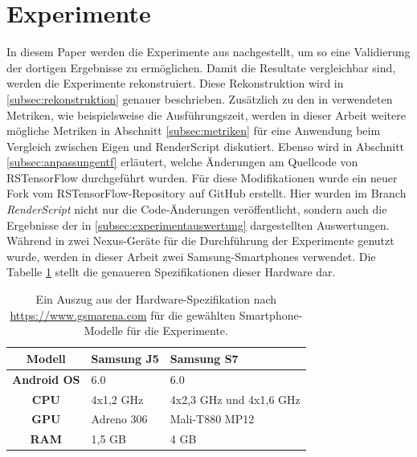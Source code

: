 \section{Experimente}
\label{sec:experimente}
In diesem Paper werden die Experimente aus \cite{rstensorflow2017} nachgestellt, um so eine Validierung der dortigen Ergebnisse zu ermöglichen. Damit die Resultate vergleichbar sind, werden die Experimente rekonstruiert. Diese Rekonstruktion wird in \ref{subsec:rekonstruktion} genauer beschrieben. Zusätzlich zu den in \cite{rstensorflow2017} verwendeten Metriken, wie beispielsweise die Ausführungszeit, werden in dieser Arbeit weitere mögliche Metriken in Abschnitt \ref{subsec:metriken} für eine Anwendung beim Vergleich zwischen Eigen und RenderScript diskutiert. Ebenso wird in Abschnitt  \ref{subsec:anpassungentf} erläutert, welche Änderungen am Quellcode von RSTensorFlow durchgeführt wurden. Für diese Modifikationen wurde ein neuer Fork \cite{rstfengelmi} vom RSTensorFlow-Repository auf GitHub erstellt. Hier wurden im Branch \textit{RenderScript} nicht nur die Code-Änderungen veröffentlicht, sondern auch die Ergebnisse der in \ref{subsec:experimentauswertung} dargestellten Auswertungen. 
\\
Während in \cite{rstensorflow2017} zwei Nexus-Geräte für die Durchführung der Experimente genutzt wurde, werden in dieser Arbeit zwei Samsung-Smartphones verwendet. Die Tabelle \ref{tbl:hardware} stellt die genaueren Spezifikationen dieser Hardware dar. 
\renewcommand{\arraystretch}{1.5}
\begin{table}[!ht]
	\begin{center}
		\begin{tabular}{c||p{3.0cm}|p{3.1cm}}
			\textbf{Modell} & Samsung J5 & Samsung S7 \\
			\hline
			\textbf{Android OS} & 6.0 & 6.0 \\
			\hline
			\textbf{CPU} & 4x1,2 GHz & 4x2,3 GHz und 4x1,6 GHz \\
			\hline
			\textbf{GPU} & Adreno 306 & Mali-T880 MP12 \\ 
			\hline
			\textbf{RAM} & 1,5 GB & 4 GB \\
		\end{tabular}
	\end{center}
	\caption{Ein Auszug aus der Hardware-Spezifikation nach \url{https://www.gsmarena.com} für die gewählten Smartphone-Modelle für die Experimente. }
	\label{tbl:hardware}
\end{table}

